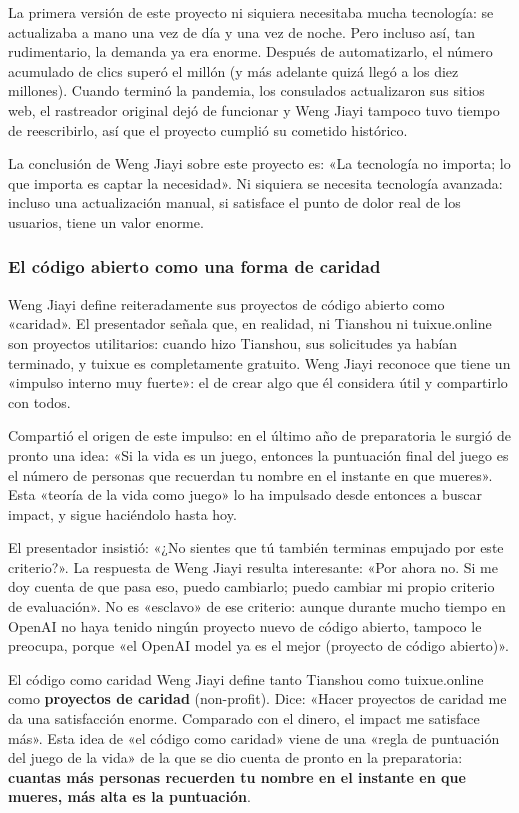 La primera versión de este proyecto ni siquiera necesitaba mucha tecnología: se actualizaba a mano una vez de día y una vez de noche. Pero incluso así, tan rudimentario, la demanda ya era enorme. Después de automatizarlo, el número acumulado de clics superó el millón (y más adelante quizá llegó a los diez millones). Cuando terminó la pandemia, los consulados actualizaron sus sitios web, el rastreador original dejó de funcionar y Weng Jiayi tampoco tuvo tiempo de reescribirlo, así que el proyecto cumplió su cometido histórico.

La conclusión de Weng Jiayi sobre este proyecto es: «La tecnología no importa; lo que importa es captar la necesidad». Ni siquiera se necesita tecnología avanzada: incluso una actualización manual, si satisface el punto de dolor real de los usuarios, tiene un valor enorme.

\subsubsection{El código abierto como una forma de caridad}

Weng Jiayi define reiteradamente sus proyectos de código abierto como «caridad». El presentador señala que, en realidad, ni Tianshou ni tuixue.online son proyectos utilitarios: cuando hizo Tianshou, sus solicitudes ya habían terminado, y tuixue es completamente gratuito. Weng Jiayi reconoce que tiene un «impulso interno muy fuerte»: el de crear algo que él considera útil y compartirlo con todos.

Compartió el origen de este impulso: en el último año de preparatoria le surgió de pronto una idea: «Si la vida es un juego, entonces la puntuación final del juego es el número de personas que recuerdan tu nombre en el instante en que mueres». Esta «teoría de la vida como juego» lo ha impulsado desde entonces a buscar impact, y sigue haciéndolo hasta hoy.

El presentador insistió: «¿No sientes que tú también terminas empujado por este criterio?». La respuesta de Weng Jiayi resulta interesante: «Por ahora no. Si me doy cuenta de que pasa eso, puedo cambiarlo; puedo cambiar mi propio criterio de evaluación». No es «esclavo» de ese criterio: aunque durante mucho tiempo en OpenAI no haya tenido ningún proyecto nuevo de código abierto, tampoco le preocupa, porque «el OpenAI model ya es el mejor (proyecto de código abierto)».

\begin{importantbox}{El código como caridad}
Weng Jiayi define tanto Tianshou como tuixue.online como \textbf{proyectos de caridad} (non-profit). Dice: «Hacer proyectos de caridad me da una satisfacción enorme. Comparado con el dinero, el impact me satisface más». Esta idea de «el código como caridad» viene de una «regla de puntuación del juego de la vida» de la que se dio cuenta de pronto en la preparatoria: \textbf{cuantas más personas recuerden tu nombre en el instante en que mueres, más alta es la puntuación}.
\end{importantbox}

